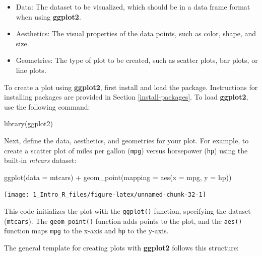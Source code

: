 \documentclass[
  11pt,
]{book}
\makeatletter
\newenvironment{Shaded}{}{}
\newcommand{\AttributeTok}[1]{#1}
\newcommand{\FunctionTok}[1]{#1}
\newcommand{\NormalTok}[1]{#1}
\newcommand{\SpecialCharTok}[1]{\textcolor[rgb]{0.39,0.39,0.39}{#1}}
\providecommand{\tightlist}{%
  \setlength{\itemsep}{0pt}\setlength{\parskip}{0pt}}
\newenvironment{kframe}{%
\medskip{}
\setlength{\fboxsep}{.8em}
 \def\at@end@of@kframe{}%
 \ifinner\ifhmode%
  \def\at@end@of@kframe{\end{minipage}}%
  \begin{minipage}{\columnwidth}%
 \fi\fi%
 \def\FrameCommand##1{\hskip\@totalleftmargin \hskip-\fboxsep
 \colorbox{shadecolor}{##1}\hskip-\fboxsep
     \hskip-\linewidth \hskip-\@totalleftmargin \hskip\columnwidth}%
 \MakeFramed {\advance\hsize-\width
   \@totalleftmargin\z@ \linewidth\hsize
   \@setminipage}}%
 {\par\unskip\endMakeFramed%
 \at@end@of@kframe}
\renewenvironment{Shaded}{\begin{kframe}}{\end{kframe}}
\theoremstyle{definition}
\theoremstyle{definition}
\theoremstyle{definition}
\theoremstyle{definition}
\theoremstyle{remark}
\makeatother
\begin{document}
\begin{itemize}
\tightlist
\item
  Data: The dataset to be visualized, which should be in a data frame format when using \textbf{ggplot2}.\\
\item
  Aesthetics: The visual properties of the data points, such as color, shape, and size.\\
\item
  Geometries: The type of plot to be created, such as scatter plots, bar plots, or line plots.
\end{itemize}

To create a plot using \textbf{ggplot2}, first install and load the package. Instructions for installing packages are provided in Section \ref{install-packages}. To load \textbf{ggplot2}, use the following command:

\begin{Shaded}
\begin{Highlighting}[]
\FunctionTok{library}\NormalTok{(ggplot2)}
\end{Highlighting}
\end{Shaded}

Next, define the data, aesthetics, and geometries for your plot. For example, to create a scatter plot of miles per gallon (\texttt{mpg}) versus horsepower (\texttt{hp}) using the built-in \emph{mtcars} dataset:

\begin{Shaded}
\begin{Highlighting}[]
\FunctionTok{ggplot}\NormalTok{(}\AttributeTok{data =}\NormalTok{ mtcars) }\SpecialCharTok{+}
  \FunctionTok{geom\_point}\NormalTok{(}\AttributeTok{mapping =} \FunctionTok{aes}\NormalTok{(}\AttributeTok{x =}\NormalTok{ mpg, }\AttributeTok{y =}\NormalTok{ hp))}
\end{Highlighting}
\end{Shaded}

\begin{center}\texttt{[image: 1\_Intro\_R\_files/figure-latex/unnamed-chunk-32-1]} \end{center}

This code initializes the plot with the \texttt{ggplot()} function, specifying the dataset (\texttt{mtcars}). The \texttt{geom\_point()} function adds points to the plot, and the \texttt{aes()} function maps \texttt{mpg} to the x-axis and \texttt{hp} to the y-axis.

The general template for creating plots with \textbf{ggplot2} follows this structure:
\end{document}
